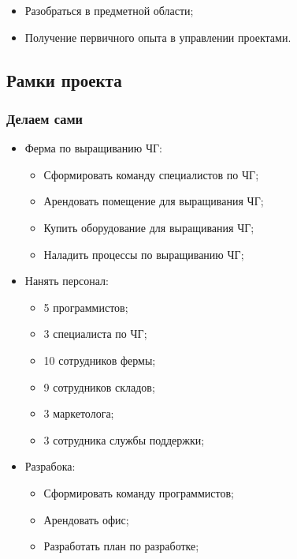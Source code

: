 \documentclass[a4paper,10pt]{article}
\begin{document}
    \begin{itemize}
        \item Разобраться в предметной области;
        \item Получение первичного опыта в управлении проектами.
    \end{itemize}




\subsection{Рамки проекта}

\subsubsection{Делаем сами}

    \begin{itemize}
        \item Ферма по выращиванию ЧГ:
            \begin{itemize}
                \item Сформировать команду специалистов по ЧГ;
                \item Арендовать помещение для выращивания ЧГ;
                \item Купить оборудование для выращивания ЧГ;
                \item Наладить процессы по выращиванию ЧГ;
            \end{itemize}
        \item Нанять персонал:
            \begin{itemize}
                \item 5 программистов;
                \item 3 специалиста по ЧГ;
                \item 10 сотрудников фермы;
                \item 9 сотрудников складов;
                \item 3 маркетолога;
                \item 3 сотрудника службы поддержки;
            \end{itemize}
        \item Разрабока:
            \begin{itemize}
                \item Сформировать команду программистов;
                \item Арендовать офис;
                \item Разработать план по разработке;

\end{itemize}
\end{itemize}
\end{document}
